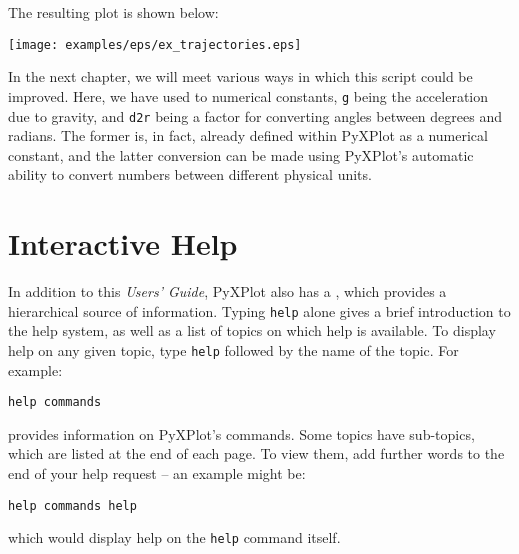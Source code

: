 {{\newline
{}\newline
{}\newline
{}
}
\nlscf
The resulting plot is shown below:
\nlscf
\begin{center}
\texttt{[image: examples/eps/ex\_trajectories.eps]}
\end{center}
\nlscf
In the next chapter, we will meet various ways in which this script could be
improved. Here, we have used to numerical constants, {\tt g} being the
acceleration due to gravity, and {\tt d2r} being a factor for converting angles
between degrees and radians.  The former is, in fact, already defined within
PyXPlot as a numerical constant, and the latter conversion can be made using
PyXPlot's automatic ability to convert numbers between different physical
units.
}

\section{Interactive Help}

In addition to this {\it Users' Guide}, PyXPlot also has a ,
which provides a hierarchical source of information. Typing {\tt help} alone
gives a brief introduction to the help system, as well as a list of topics on
which help is available. To display help on any given topic, type {\tt help}
followed by the name of the topic. For example:

\begin{verbatim}
help commands
\end{verbatim}

\noindent provides information on PyXPlot's commands. Some topics have
sub-topics, which are listed at the end of each page. To view them, add further
words to the end of your help request -- an example might be:

\begin{verbatim}
help commands help
\end{verbatim}

\noindent which would display help on the {\tt help} command itself.

